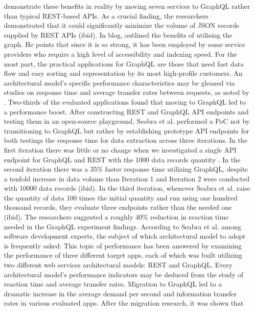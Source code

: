 demonstrate these benefits in reality by moving seven services to GraphQL rather
than typical REST-based APIs. As a crucial finding, the researchers demonstrated
that it could significantly minimize the volume of JSON records supplied by REST
APIs (ibid). In blog, \citet{kristopherUniqueBenefitsUsing2018}
outlined the benefits of utilising the graph. He points that since it is so
strong, it has been employed by some service providers who require a high level
of accessibility and indexing speed. For the most part, the practical
applications for GraphQL are those that need fast data flow and easy sorting and
representation by its most high-profile customers. An architectural model's
specific performance characteristics may be gleaned via studies on response time
and average transfer rates between requests, as noted by
\citet{seabraRESTGraphQLPerformance2019}. Two-thirds of the evaluated
applications found that moving to GraphQL led to a performance boost. After
constructing REST and GraphQL API endpoints and testing them in an open-source
playground, Seabra et al. performed a PoC not by transitioning to
GraphQL but rather by establishing prototype API endpoints for both testings the
response time for data extraction across three iterations. In the first
iteration there was little or no change when we investigated a single API
endpoint for GraphQL and REST with the 1000 data records quantity
\citep{seabraRESTGraphQLPerformance2019}. In the second iteration there was a
35\% faster response time utilizing GraphQL, despite a tenfold increase in data
volume than Iteration 1 and Iteration 2 were conducted with 10000 data records
(ibid). In the third iteration, whenever Seabra et al. raise the quantity of
data 100 times the initial quantity and run using one hundred thousand records, they
evaluate three endpoints rather than the needed one (ibid). The
researchers suggested a roughly 40\% reduction in reaction time needed in
the GraphQL experiment findings. According to Seabra et al. among software
development experts, the subject of which architectural model to adopt is
frequently asked: This topic of performance has been answered by examining the
performance of three different target apps, each of which was built utilizing
two different web services architectural models: REST and GraphQL. Every
architectural model's performance indicators may be deduced from the study of
reaction time and average transfer rates. Migration to GraphQL led to a dramatic
increase in the average demand per second and information transfer rates in
various evaluated apps. After the migration research, it was shown that
